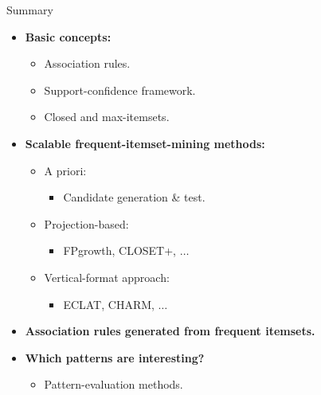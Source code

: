 \documentclass[aspectratio=169,t,xcolor=dvipsnames]{beamer}
\begin{document}
  {
    \begin{frame}{Summary}
        \begin{itemize}
          \item \textbf{Basic concepts:}
          \begin{itemize}
            \item Association rules.
            \item Support-confidence framework.
            \item Closed and max-itemsets.
          \end{itemize}
          \item \textbf{Scalable frequent-itemset-mining methods:}
          \begin{itemize}
            \item A priori:
            \begin{itemize}
              \item Candidate generation \& test.
            \end{itemize}
            \item Projection-based:
            \begin{itemize}
              \item FPgrowth, CLOSET+, $\ldots$
            \end{itemize}
            \item Vertical-format approach:
            \begin{itemize}
              \item ECLAT, CHARM, $\ldots$
            \end{itemize}
          \end{itemize}
          \item \textbf{Association rules generated from frequent itemsets.}
          \item \textbf{Which patterns are interesting?}
          \begin{itemize}
            \item Pattern-evaluation methods.
          \end{itemize}
        \end{itemize}
    \end{frame}
  }
\end{document}
